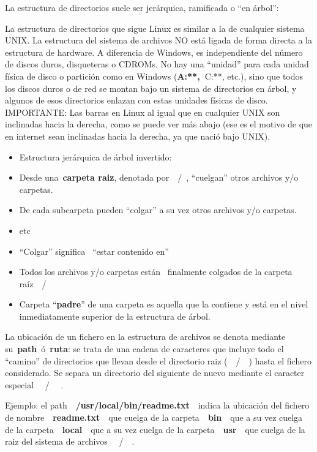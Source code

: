 \documentclass[
  jou,
  floatsintext,
  longtable,
  a4paper,
  nolmodern,
  notxfonts,
  notimes,
  12pt,
  colorlinks=true,linkcolor=blue,citecolor=blue,urlcolor=blue]{apa7}
\begin{document}
La estructura de directorios suele ser jerárquica, ramificada o ``en
árbol'':

La estructura de directorios que sigue Linux es similar a la de
cualquier sistema UNIX. La estructura del sistema de archivos NO está
ligada de forma directa a la estructura de hardware. A diferencia de
Windows, es independiente del número de discos duros, disqueteras o
CDROMs. No hay una ``unidad'' para cada unidad física de disco o
partición como en Windows (\textbf{A:**,~}C:**, etc.), sino que todos
los discos duros o de red se montan bajo un sistema de directorios en
árbol, y algunos de esos directorios enlazan con estas unidades físicas
de disco. IMPORTANTE: Las barras en Linux al igual que en cualquier UNIX
son inclinadas hacia la derecha, como se puede ver más abajo (ese es el
motivo de que en internet sean inclinadas hacia la derecha, ya que nació
bajo UNIX).

\begin{itemize}
\item
  Estructura jerárquica de árbol invertido:
\item
  Desde una~\textbf{carpeta raiz}, denotada por~~/~, ``cuelgan'' otros
  archivos y/o carpetas.
\item
  De cada subcarpeta pueden ``colgar'' a su vez otros archivos y/o
  carpetas.
\item
  etc
\item
  ``Colgar'' significa~ ``estar contenido en''
\item
  Todos los archivos y/o carpetas están~ finalmente colgados de la
  carpeta raíz~~/
\item
  Carpeta ``\textbf{padre}'' de una carpeta es aquella que la contiene y
  está en el nivel inmediatamente superior de la estructura de árbol.
\end{itemize}

La ubicación de un fichero en la estructura de archivos se denota
mediante su~\textbf{path}~ó~\textbf{ruta}: se trata de una cadena de
caracteres que incluye todo el ``camino'' de directorios que llevan
desde el directorio raiz (~~/~~) hasta el fichero considerado. Se separa
un directorio del siguiente de nuevo mediante el caracter especial ~~/~~
.

Ejemplo: el path~~\textbf{/usr/local/bin/readme.txt}~~indica la
ubicación del fichero de nombre~~\textbf{readme.txt}~~que cuelga de la
carpeta~~\textbf{bin}~~que a su vez cuelga de la
carpeta~~\textbf{local}~~que a su vez cuelga de la
carpeta~~\textbf{usr}~~que cuelga de la raiz del sistema de archivos
~~/~~.
\end{document}
